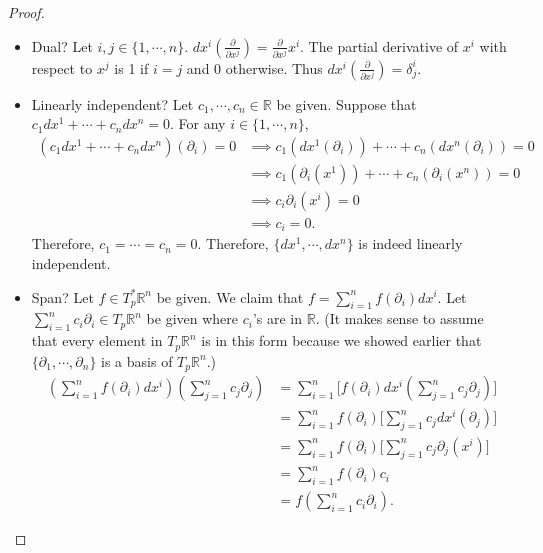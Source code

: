 \documentclass[12pt, psamsfonts]{amsart}
\theoremstyle{definition}
\theoremstyle{remark}
\numberwithin{equation}{section}
\begin{document}
\begin{proof}
$ $
  \begin{itemize}
    \item
      Dual?
      Let $i, j \in \{1, \cdots, n \}$.
      $dx^i(\frac{\partial}{\partial x^j}) = \frac{\partial}{\partial x^j} x^i$.
      The partial derivative of $x^i$ with respect to $x^j$ is 1 if $i = j$ and 0 otherwise.
      Thus $dx^i(\frac{\partial}{\partial x^j}) = \delta^i_j$.
    \item
      Linearly independent?
      Let $c_1, \cdots, c_n \in \mathbb{R}$ be given.
      Suppose that $c_1dx^1 + \cdots + c_ndx^n = 0$.
      For any $i \in \{ 1, \cdots, n \}$,
      \begin{align*} (c_1dx^1 + \cdots + c_ndx^n)(\partial_i) = 0
          &\implies c_1(dx^1(\partial_i)) + \cdots + c_n(dx^n(\partial_i)) = 0 \\
          &\implies c_1(\partial_i(x^1)) + \cdots + c_n(\partial_i(x^n)) = 0 \\
          &\implies c_i\partial_i(x^i) = 0 \\
          &\implies c_i = 0.
      \end{align*}
      Therefore, $c_1 = \cdots = c_n = 0$.
      Therefore, $\{ dx^1, \cdots, dx^n \}$ is indeed linearly independent.
    \item
      Span?
      Let $f \in T_p^*\mathbb{R}^n$ be given.
      We claim that $f = \sum_{i=1}^{n} f(\partial_i)dx^i$.
      Let $\sum_{i=1}^{n} c_i\partial_i \in T_p \mathbb{R}^n$ be given where $c_i$'s are in $\mathbb{R}$.
      (It makes sense to assume that every element in $T_p\mathbb{R}^n$ is in this form because we showed earlier that $\{ \partial_1, \cdots, \partial_n \}$ is a basis of $T_p \mathbb{R}^n$.)
      \begin{align*}
        (\sum_{i=1}^{n} f(\partial_i)dx^i)(\sum_{j=1}^{n} c_j\partial_j)
          &= \sum_{i=1}^{n} \big[f(\partial_i)dx^i(\sum_{j=1}^{n} c_j\partial_j)\big] \\
          &= \sum_{i=1}^{n} f(\partial_i) \big[\sum_{j=1}^{n} c_jdx^i(\partial_j)\big] \\
          &= \sum_{i=1}^{n} f(\partial_i) \big[\sum_{j=1}^{n} c_j\partial_j(x^i)\big] \\
          &= \sum_{i=1}^{n} f(\partial_i) c_i \\
          &= f(\sum_{i=1}^{n} c_i\partial_i).
      \end{align*}
  \end{itemize}
\end{proof}
\end{document}
